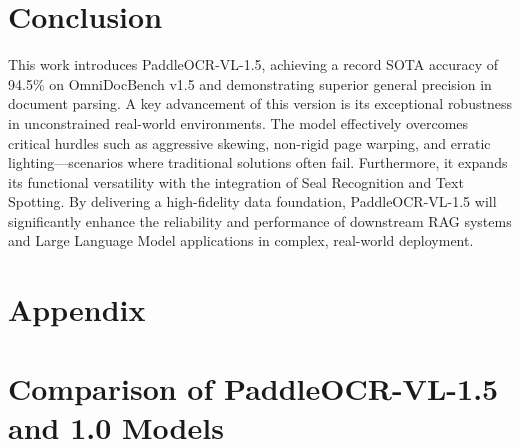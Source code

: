 \documentclass[11pt, a4paper,logo,  copyright, nonumbering]{paddleocr}
\begin{document}
\section{Conclusion}

This work introduces PaddleOCR-VL-1.5, achieving a record SOTA accuracy of 94.5\% on OmniDocBench v1.5 and demonstrating superior general precision in document parsing. A key advancement of this version is its exceptional robustness in unconstrained real-world environments. The model effectively overcomes critical hurdles such as aggressive skewing, non-rigid page warping, and erratic lighting—scenarios where traditional solutions often fail. Furthermore, it expands its functional versatility with the integration of Seal Recognition and Text Spotting. By delivering a high-fidelity data foundation, PaddleOCR-VL-1.5 will significantly enhance the reliability and performance of downstream RAG systems and Large Language Model applications in complex, real-world deployment.
% 




\setcounter{figure}{0}
\makeatletter 
\renewcommand{\thefigure}{A\@arabic\c@figure}
\makeatother

\setcounter{table}{0}
\makeatletter 
\renewcommand{\thetable}{A\@arabic\c@table}
\makeatother


\clearpage 
\newpage
\appendix

\section*{Appendix}
\label{sec:appendix}

\section{Comparison of PaddleOCR-VL-1.5 and 1.0 Models}
\label{sec:Comparison of PaddleOCR-VL-1.5 and 1.0 Models}
\end{document}
